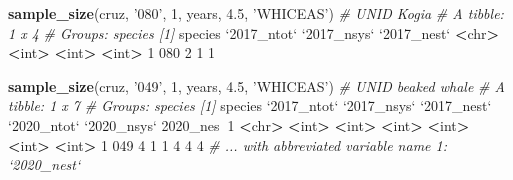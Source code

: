 \documentclass[
]{book}
\newenvironment{Shaded}{\begin{snugshade}}{\end{snugshade}}
\newcommand{\CommentTok}[1]{\textcolor[rgb]{0.56,0.35,0.01}{\textit{#1}}}
\newcommand{\DataTypeTok}[1]{\textcolor[rgb]{0.13,0.29,0.53}{#1}}
\newcommand{\DecValTok}[1]{\textcolor[rgb]{0.00,0.00,0.81}{#1}}
\newcommand{\ErrorTok}[1]{\textcolor[rgb]{0.64,0.00,0.00}{\textbf{#1}}}
\newcommand{\FloatTok}[1]{\textcolor[rgb]{0.00,0.00,0.81}{#1}}
\newcommand{\KeywordTok}[1]{\textcolor[rgb]{0.13,0.29,0.53}{\textbf{#1}}}
\newcommand{\NormalTok}[1]{#1}
\newcommand{\OperatorTok}[1]{\textcolor[rgb]{0.81,0.36,0.00}{\textbf{#1}}}
\newcommand{\StringTok}[1]{\textcolor[rgb]{0.31,0.60,0.02}{#1}}
\begin{document}
\begin{Shaded}
\begin{Highlighting}[]
\KeywordTok{sample_size}\NormalTok{(cruz, }\StringTok{'080'}\NormalTok{, }\DecValTok{1}\NormalTok{, years, }\FloatTok{4.5}\NormalTok{, }\StringTok{'WHICEAS'}\NormalTok{) }\CommentTok{# UNID Kogia}
\CommentTok{# A tibble: 1 x 4}
\CommentTok{# Groups:   species [1]}
\NormalTok{  species }\StringTok{`}\DataTypeTok{2017_ntot}\StringTok{`} \StringTok{`}\DataTypeTok{2017_nsys}\StringTok{`} \StringTok{`}\DataTypeTok{2017_nest}\StringTok{`}
  \OperatorTok{<}\NormalTok{chr}\OperatorTok{>}\StringTok{         }\ErrorTok{<}\NormalTok{int}\OperatorTok{>}\StringTok{       }\ErrorTok{<}\NormalTok{int}\OperatorTok{>}\StringTok{       }\ErrorTok{<}\NormalTok{int}\OperatorTok{>}
\DecValTok{1} \DecValTok{080}               \DecValTok{2}           \DecValTok{1}           \DecValTok{1}

\KeywordTok{sample_size}\NormalTok{(cruz, }\StringTok{'049'}\NormalTok{, }\DecValTok{1}\NormalTok{, years, }\FloatTok{4.5}\NormalTok{, }\StringTok{'WHICEAS'}\NormalTok{) }\CommentTok{# UNID beaked whale}
\CommentTok{# A tibble: 1 x 7}
\CommentTok{# Groups:   species [1]}
\NormalTok{  species }\StringTok{`}\DataTypeTok{2017_ntot}\StringTok{`} \StringTok{`}\DataTypeTok{2017_nsys}\StringTok{`} \StringTok{`}\DataTypeTok{2017_nest}\StringTok{`} \StringTok{`}\DataTypeTok{2020_ntot}\StringTok{`} \StringTok{`}\DataTypeTok{2020_nsys}\StringTok{`} \DecValTok{2020}\NormalTok{_nes}\OperatorTok{~}\DecValTok{1}
  \OperatorTok{<}\NormalTok{chr}\OperatorTok{>}\StringTok{         }\ErrorTok{<}\NormalTok{int}\OperatorTok{>}\StringTok{       }\ErrorTok{<}\NormalTok{int}\OperatorTok{>}\StringTok{       }\ErrorTok{<}\NormalTok{int}\OperatorTok{>}\StringTok{       }\ErrorTok{<}\NormalTok{int}\OperatorTok{>}\StringTok{       }\ErrorTok{<}\NormalTok{int}\OperatorTok{>}\StringTok{      }\ErrorTok{<}\NormalTok{int}\OperatorTok{>}
\DecValTok{1} \DecValTok{049}               \DecValTok{4}           \DecValTok{1}           \DecValTok{1}           \DecValTok{4}           \DecValTok{4}          \DecValTok{4}
\CommentTok{# ... with abbreviated variable name 1: `2020_nest`}


\end{Highlighting}
\end{Shaded}
\end{document}
